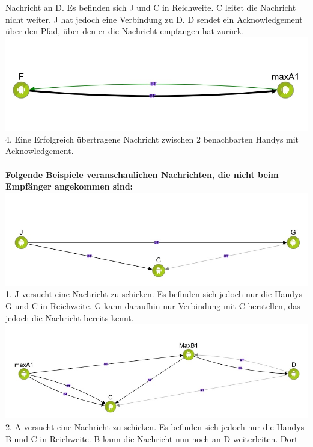 Nachricht an D. Es befinden sich J und C in Reichweite. C leitet die
Nachricht nicht weiter. J hat jedoch eine Verbindung zu D. D sendet ein
Acknowledgement über den Pfad, über den er die Nachricht empfangen hat
zurück.\\ \includegraphics[width=1.0\textwidth]{belege/grosstests/Bilder/Erfolg1.jpg} \\4. Eine
Erfolgreich übertragene Nachricht zwischen 2 benachbarten Handys mit
Acknowledgement.
\\\\
\textbf{Folgende Beispiele veranschaulichen Nachrichten, die nicht beim
Empfänger angekommen sind:}\\
\includegraphics[width=1.0\textwidth]{belege/grosstests/Bilder/Miserfolg6.jpg}\\ 1. J versucht
eine Nachricht zu schicken. Es befinden sich jedoch nur die Handys G und
C in Reichweite. G kann daraufhin nur Verbindung mit C herstellen, das
jedoch die Nachricht bereits kennt.\\
\includegraphics[width=1.0\textwidth]{belege/grosstests/Bilder/Miserfolg5.jpg}\\ 2. A versucht
eine Nachricht zu schicken. Es befinden sich jedoch nur die Handys B und
C in Reichweite. B kann die Nachricht nun noch an D weiterleiten. Dort
